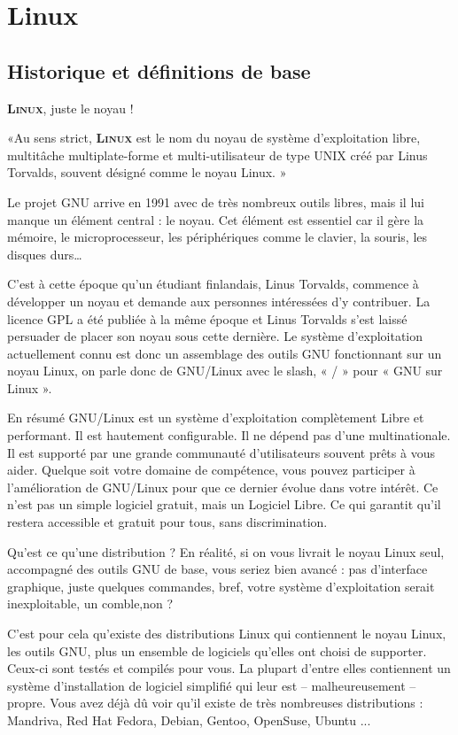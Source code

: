 \documentclass[10pt]{beamer}
\newcommand{\linux}{\textbf{\textsc{Linux}}\xspace}
\begin{document}
\section{Linux}
\subsection{Historique et définitions de base}
\begin{frame}{\linux, juste le noyau !}

«Au sens strict, \linux est le nom du noyau de système d'exploitation libre, multitâche multiplate-forme et multi-utilisateur de type UNIX créé par Linus Torvalds, souvent désigné comme le noyau Linux. »

Le projet GNU arrive en 1991 avec de très nombreux outils libres, mais il lui manque un élément central : le noyau. Cet élément est essentiel car il gère la mémoire, le microprocesseur, les périphériques comme le clavier, la souris, les disques durs\ldots

C'est à cette époque qu'un étudiant finlandais, Linus Torvalds, commence à développer un noyau et demande aux personnes intéressées d'y contribuer. La licence GPL a été publiée à la même époque et Linus Torvalds s'est laissé persuader de placer son noyau sous cette dernière. 
Le système d'exploitation actuellement connu est donc un assemblage des outils GNU fonctionnant sur un noyau Linux, on parle donc de GNU/Linux avec le slash, « / » pour « GNU sur Linux ».

\end{frame}

\begin{frame}
\begin{alertblock}{En résumé}
GNU/Linux est un système d'exploitation complètement Libre et performant. Il est
hautement configurable. Il ne dépend pas d'une multinationale. Il est supporté par
une grande communauté d'utilisateurs souvent prêts à vous aider. Quelque soit
votre   domaine   de   compétence,   vous   pouvez   participer   à   l'amélioration   de
GNU/Linux pour que ce dernier évolue dans votre intérêt. Ce n'est pas un simple
logiciel gratuit, mais un Logiciel Libre. Ce qui garantit qu'il restera accessible et
gratuit pour tous, sans discrimination.
\end{alertblock}
\end{frame}

\begin{frame}{Qu'est ce qu'une distribution ?}
En réalité, si on vous livrait le noyau Linux seul, accompagné des outils GNU de base, vous seriez bien avancé : pas d'interface graphique, juste quelques commandes, bref, votre système d'exploitation serait inexploitable, un comble,non ?

C'est pour cela qu'existe des distributions Linux qui contiennent le noyau Linux, les outils GNU, plus un ensemble de logiciels qu'elles ont choisi de supporter. Ceux-ci sont testés et compilés pour vous. La plupart d'entre elles contiennent un système d'installation de logiciel simplifié qui leur est – malheureusement – propre. Vous avez déjà dû voir qu'il existe de très nombreuses distributions
: Mandriva, Red Hat Fedora, Debian, Gentoo, OpenSuse, Ubuntu ... 
\end{frame}
\end{document}
